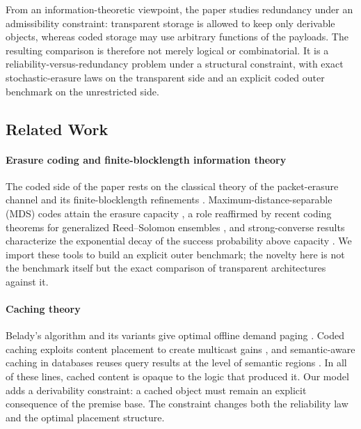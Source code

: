 \documentclass[journal]{IEEEtran}
\numberwithin{equation}{section}
\begin{document}
From an information-theoretic viewpoint, the paper studies redundancy under
an admissibility constraint: transparent storage is allowed to keep only
derivable objects, whereas coded storage may use arbitrary functions of the
payloads.  The resulting comparison is therefore not merely logical or
combinatorial.  It is a reliability-versus-redundancy problem under a
structural constraint, with exact stochastic-erasure laws on the
transparent side and an explicit coded outer benchmark on the unrestricted
side.

\subsection{Related Work}
\label{subsec:related-work}

\paragraph*{Erasure coding and finite-blocklength information theory}
The coded side of the paper rests on the classical theory of the
packet-erasure channel
\cite{shannon1948mathematical,gallager1968information,cover2006elements} and
its finite-blocklength refinements \cite{polyanskiy2010channel}.
Maximum-distance-separable (MDS) codes attain the erasure capacity
\cite{singleton1964maximum,macwilliams1977theory}, a role reaffirmed by
recent coding theorems for generalized Reed--Solomon ensembles
\cite{zheng2026coding}, and strong-converse results
characterize the exponential decay of the success probability above capacity
\cite{hamad2024strong,takeuchi2025tight}.  We import these tools to build an
explicit outer benchmark; the novelty here is not the benchmark itself but
the exact comparison of transparent architectures against it.

\paragraph*{Caching theory}
Belady's algorithm and its variants give optimal offline demand paging
\cite{belady1966study,megiddo2003arc}.  Coded caching exploits content
placement to create multicast gains
\cite{maddah2014fundamental,wan2021fundamental,lu2026demand}, and
semantic-aware caching in databases reuses query results at the level of
semantic regions \cite{dar1996semantic}.  In all of these lines, cached
content is opaque to the logic that produced it.  Our model adds a
derivability constraint: a cached object must remain an explicit consequence
of the premise base.  The constraint changes both the reliability law and the
optimal placement structure.
\end{document}
